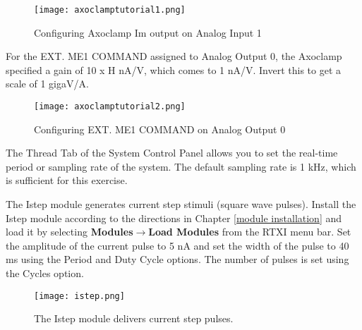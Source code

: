 \begin{figure}[h]
\begin{center}
\texttt{[image: axoclamptutorial1.png]} 
\caption[Axoclamp Tutorial: Analog Input 1]{Configuring Axoclamp Im output on Analog Input 1} 
\end{center}
\label{fig:axoclamptutorial1}
\end{figure}
\vspace{1.5cm}

For the EXT. ME1 COMMAND assigned to Analog Output 0, the Axoclamp specified a gain of 10 x H nA/V, which comes to 1 nA/V. Invert this to get a scale of 1 gigaV/A.

\begin{figure}[h]
\begin{center}
\texttt{[image: axoclamptutorial2.png]} 
\caption[Axoclamp Tutorial: Analog Output 0]{Configuring EXT. ME1 COMMAND on Analog Output 0}
\end{center}
\label{fig:axoclamptutorial2}
\end{figure}

\attention The Thread Tab of the System Control Panel allows you to set the real-time period or sampling rate  of the system. The default sampling rate is 1 kHz, which is sufficient for this exercise.

\vspace{1cm}
 The Istep module generates  current step stimuli (square wave pulses). Install the Istep module according to the directions in Chapter \ref{module installation} and load it by selecting \textbf{Modules}$\rightarrow$\textbf{Load Modules} from the RTXI menu bar. Set the amplitude of the current pulse to 5 nA and set the width of the pulse to 40 ms using the Period and Duty Cycle options. The number of pulses is set using the Cycles option.

\begin{figure}[h]
\begin{center}
\texttt{[image: istep.png]} 
\caption[Istep]{The Istep module delivers current step pulses.} 
\end{center}
\label{fig:istep}
\end{figure}

